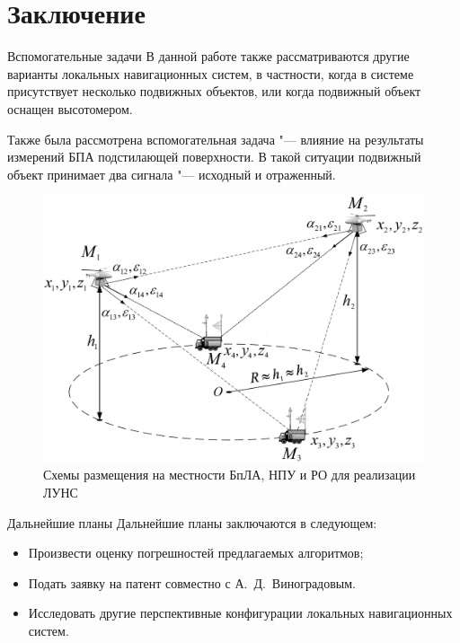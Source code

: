 \documentclass[russian,hyperref={unicode}]{beamer}
\begin{document}
  \section{Заключение}

  \begin{frame}{Вспомогательные задачи}
    В данной работе также рассматриваются другие варианты локальных навигационных систем, в частности, когда в системе присутствует несколько подвижных объектов, или когда подвижный объект оснащен высотомером.

    Также была рассмотрена вспомогательная задача "--- влияние на результаты измерений БПА подстилающей поверхности. В такой ситуации подвижный объект принимает два сигнала "--- исходный и отраженный.
  \end{frame}

  \begin{frame}
    \begin{figure}
      \begin{center}
        \includegraphics[height=.8\textheight]{pic2}

        \caption{Схемы размещения на местности БпЛА, НПУ и РО для реализации ЛУНС}
      \end{center}
    \end{figure}
  \end{frame}

  \begin{frame}{Дальнейшие планы}
    Дальнейшие планы заключаются в следующем:
    \begin{itemize}
      \item Произвести оценку погрешностей предлагаемых алгоритмов;
      \item Подать заявку на патент совместно с А.~Д.~Виноградовым.
      \item Исследовать другие перспективные конфигурации локальных навигационных систем.
    \end{itemize}
  \end{frame}
\end{document}
